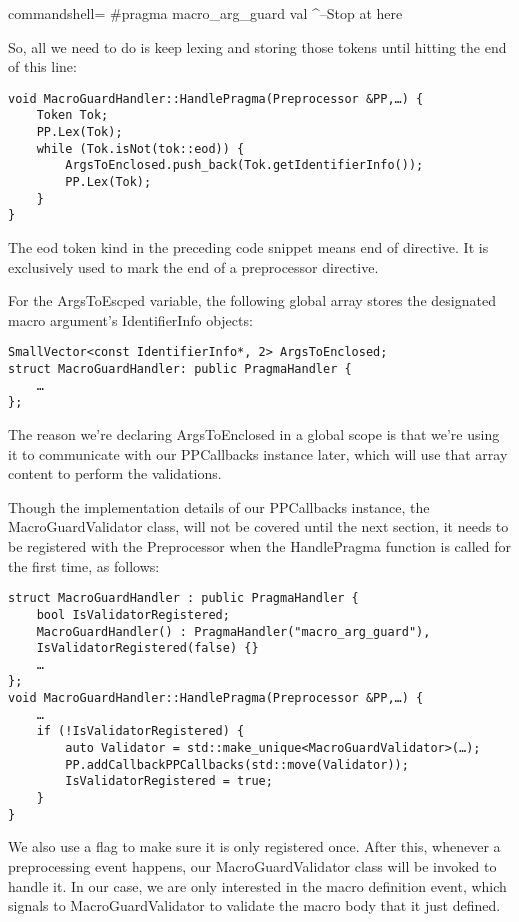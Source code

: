 \begin{tcblisting}{commandshell={}}
#pragma macro_arg_guard val
                           ^--Stop at here
\end{tcblisting}

So, all we need to do is keep lexing and storing those tokens until hitting the end of this line:

\begin{lstlisting}[style=styleCXX]
void MacroGuardHandler::HandlePragma(Preprocessor &PP,…) {
	Token Tok;
	PP.Lex(Tok);
	while (Tok.isNot(tok::eod)) {
		ArgsToEnclosed.push_back(Tok.getIdentifierInfo());
		PP.Lex(Tok);
	}
}
\end{lstlisting}

The eod token kind in the preceding code snippet means end of directive. It is exclusively used to mark the end of a preprocessor directive.

For the ArgsToEscped variable, the following global array stores the designated macro argument's IdentifierInfo objects:

\begin{lstlisting}[style=styleCXX]
SmallVector<const IdentifierInfo*, 2> ArgsToEnclosed;
struct MacroGuardHandler: public PragmaHandler {
	…
};
\end{lstlisting}

The reason we're declaring ArgsToEnclosed in a global scope is that we're using it to communicate with our PPCallbacks instance later, which will use that array content to perform the validations.

Though the implementation details of our PPCallbacks instance, the MacroGuardValidator class, will not be covered until the next section, it needs to be registered with the Preprocessor when the HandlePragma function is called for the first time, as follows:

\begin{lstlisting}[style=styleCXX]
struct MacroGuardHandler : public PragmaHandler {
	bool IsValidatorRegistered;
	MacroGuardHandler() : PragmaHandler("macro_arg_guard"),
	IsValidatorRegistered(false) {}
	…
};
void MacroGuardHandler::HandlePragma(Preprocessor &PP,…) {
	…
	if (!IsValidatorRegistered) {
		auto Validator = std::make_unique<MacroGuardValidator>(…);
		PP.addCallbackPPCallbacks(std::move(Validator));
		IsValidatorRegistered = true;
	}
}
\end{lstlisting}

We also use a flag to make sure it is only registered once. After this, whenever a preprocessing event happens, our MacroGuardValidator class will be invoked to handle it. In our case, we are only interested in the macro definition event, which signals to MacroGuardValidator to validate the macro body that it just defined.

